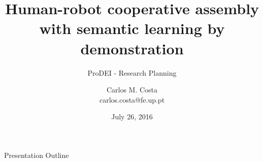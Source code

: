 





\title{Human-robot cooperative assembly with semantic learning by demonstration}
\subtitle{ProDEI - Research Planning}
\author{Carlos M. Costa\texorpdfstring{\\{\ttfamily carlos.costa@fe.up.pt}}{}}
\date{July 26, 2016}




\begin{frame}
	\titlepage
\end{frame}




\begin{frame}{Presentation Outline}
	\begingroup
	\scriptsize
	\tableofcontents
	\endgroup
\end{frame}














